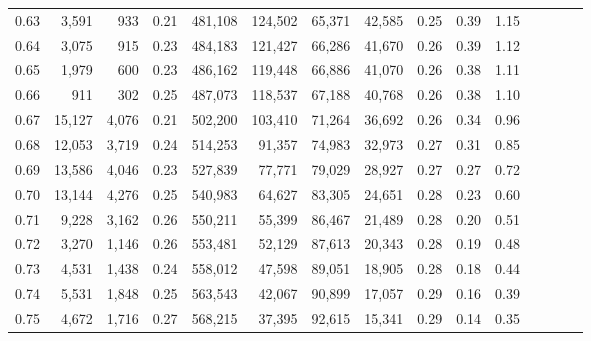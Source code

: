 \begin{tabular}{rrrcrrrrrrrrrrr}
0.63 &   3,591 &    933 &                                       0.21 &  481,108 &  124,502 &   65,371 &   42,585 &  0.25 &  0.39 &                         1.15 \\
0.64 &   3,075 &    915 &                                       0.23 &  484,183 &  121,427 &   66,286 &   41,670 &  0.26 &  0.39 &                         1.12 \\
0.65 &   1,979 &    600 &                                       0.23 &  486,162 &  119,448 &   66,886 &   41,070 &  0.26 &  0.38 &                         1.11 \\
0.66 &     911 &    302 &                                       0.25 &  487,073 &  118,537 &   67,188 &   40,768 &  0.26 &  0.38 &                         1.10 \\
0.67 &  15,127 &  4,076 &                                       0.21 &  502,200 &  103,410 &   71,264 &   36,692 &  0.26 &  0.34 &                         0.96 \\
0.68 &  12,053 &  3,719 &                                       0.24 &  514,253 &   91,357 &   74,983 &   32,973 &  0.27 &  0.31 &                         0.85 \\
0.69 &  13,586 &  4,046 &                                       0.23 &  527,839 &   77,771 &   79,029 &   28,927 &  0.27 &  0.27 &                         0.72 \\
0.70 &  13,144 &  4,276 &                                       0.25 &  540,983 &   64,627 &   83,305 &   24,651 &  0.28 &  0.23 &                         0.60 \\
0.71 &   9,228 &  3,162 &                                       0.26 &  550,211 &   55,399 &   86,467 &   21,489 &  0.28 &  0.20 &                         0.51 \\
0.72 &   3,270 &  1,146 &                                       0.26 &  553,481 &   52,129 &   87,613 &   20,343 &  0.28 &  0.19 &                         0.48 \\
0.73 &   4,531 &  1,438 &                                       0.24 &  558,012 &   47,598 &   89,051 &   18,905 &  0.28 &  0.18 &                         0.44 \\
0.74 &   5,531 &  1,848 &                                       0.25 &  563,543 &   42,067 &   90,899 &   17,057 &  0.29 &  0.16 &                         0.39 \\
0.75 &   4,672 &  1,716 &                                       0.27 &  568,215 &   37,395 &   92,615 &   15,341 &  0.29 &  0.14 &                         0.35 \\

\end{tabular}
